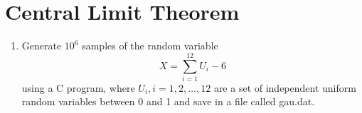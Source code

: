 \documentclass[journal,12pt,twocolumn]{IEEEtran}
\renewcommand\thesection{\arabic{section}}
\begin{document}
\section{Central Limit Theorem}
\begin{enumerate}[label=\thesection.\arabic*.,ref=\thesection.\theenumi]
\item Generate $10^6$ samples of the random variable
    \begin{equation}
        X=\sum_{i=1}^{12} U_i-6        
    \end{equation}
    using a C program, where $U_i, i = 1, 2,\ldots, 12$ are a set of independent uniform random variables between 0 and 1 and save in a file called gau.dat.\\
    

\end{enumerate}
\end{document}
